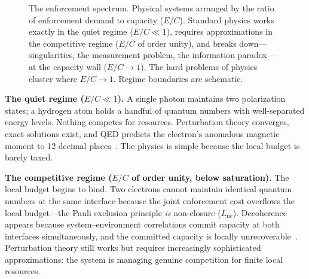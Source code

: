 \documentclass[11pt]{article}
\theoremstyle{remark}
\begin{document}
\begin{figure}[ht]

\medskip
\caption{The enforcement spectrum.  Physical systems arranged by the ratio of enforcement demand to capacity ($E/C$).  Standard physics works exactly in the quiet regime ($E/C \ll 1$), requires approximations in the competitive regime ($E/C$ of order unity), and breaks down---singularities, the measurement problem, the information paradox---at the capacity wall ($E/C \to 1$).  The hard problems of physics cluster where $E/C \to 1$.  Regime boundaries are schematic.}
\label{fig:spectrum}
\end{figure}

\medskip\noindent\textbf{The quiet regime ($E/C \ll 1$).}
A single photon maintains two polarization states; a hydrogen atom holds a handful of quantum numbers with well-separated energy levels.  Nothing competes for resources.  Perturbation theory converges, exact solutions exist, and QED predicts the electron's anomalous magnetic moment to 12 decimal places~\cite{Aoyama2020}.  The physics is simple because the local budget is barely taxed.

\medskip\noindent\textbf{The competitive regime ($E/C$ of order unity, below saturation).}
The local budget begins to bind.  Two electrons cannot maintain identical quantum numbers at the same interface because the joint enforcement cost overflows the local budget---the Pauli exclusion principle \emph{is} non-closure ($L_{\mathrm{nc}}$).  Decoherence appears because system--environment correlations commit capacity at both interfaces simultaneously, and the committed capacity is locally unrecoverable~\cite{Zurek2003}.  Perturbation theory still works but requires increasingly sophisticated approximations: the system is managing genuine competition for finite local resources.
\end{document}
